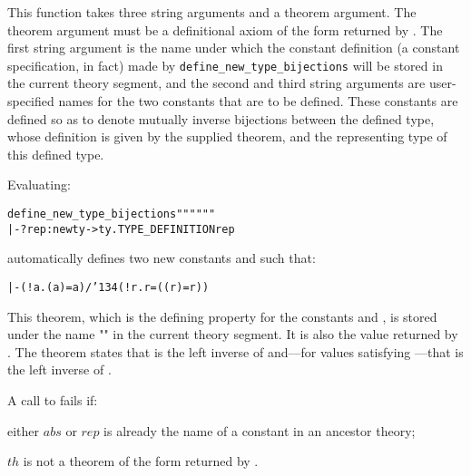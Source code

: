 \noindent This function takes three string arguments and a theorem argument.
The theorem argument must be a definitional axiom of the form returned by
.  The first string argument is the name under which
the constant definition (a constant specification, in fact) made by
{\small\verb!define_new_type_bijections!} will be stored in the current theory
segment, and the second and third string arguments are user-specified names for
the two constants that are to be defined. These constants are defined so as to
denote mutually inverse bijections between the defined type, whose definition
is given by the supplied theorem, and the representing type of this defined
type.

Evaluating:

\medskip
{\def\op{{\normalsize\sl op}}
\begin{hol}\begin{alltt}
   define\_new\_type\_bijections "" "" ""
           |- ?rep:newty->ty. TYPE\_DEFINITION  rep
\end{alltt}\end{hol}}

\medskip

\noindent automatically defines two new constants
 and 
such that:

{\def\bk{\char'134}
\begin{hol}\begin{alltt}
   |- (!a. ( a) = a) /\bk (!r.  r = (( r) = r))
\end{alltt}\end{hol}}

\noindent This theorem, which is the defining property for the constants
 and , is stored under the name "" in the current theory
segment.  It is also the value returned by .
The theorem states that  is the left inverse of  and---for
values satisfying ---that  is the left inverse of .

A call to
fails if:

\begin{myenumerate}
\item either $abs$ or $rep$ is already the name of a constant in
an ancestor theory;
\item $th$ is not a theorem of the form returned by
.
\end{myenumerate}%

